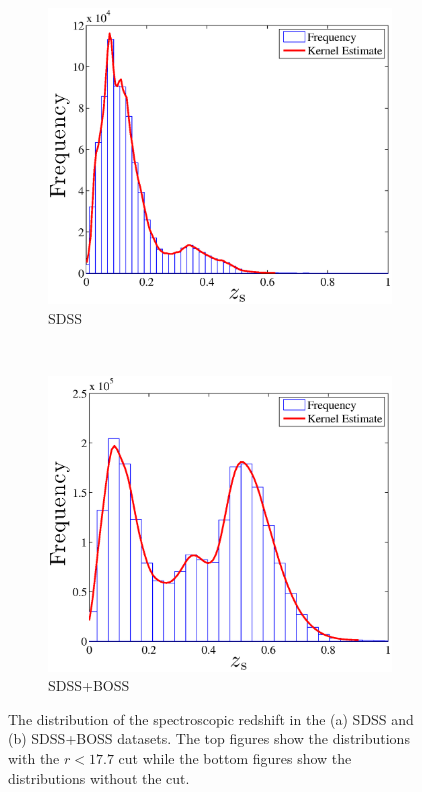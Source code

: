 \documentclass[useAMS,usenatbib,fleqn]{mn2e}
\begin{document}
\begin{figure}
        
       \begin{subfigure}[b]{0.45\textwidth}
                \includegraphics[width=\textwidth]{figures/zspec_sdss.eps}
                \caption{SDSS}
        \end{subfigure}
        ~
        \begin{subfigure}[b]{0.45\textwidth}
                \includegraphics[width=\textwidth]{figures/zspec_boss.eps}
                \caption{SDSS+BOSS}
        \end{subfigure}

        
        \caption{The distribution of the spectroscopic redshift in the (a) SDSS and (b) SDSS+BOSS datasets. The top figures show the distributions with the $r<17.7$ cut while the bottom figures show the distributions without the cut.}
        \label{fig-zpec-sdss}
\end{figure}
\end{document}
